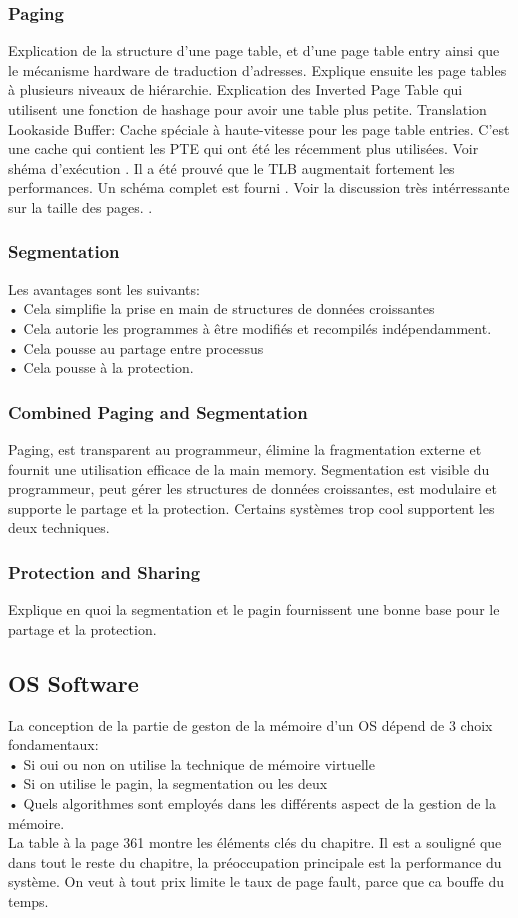 \subsubsection{Paging}
Explication de la structure d'une page table, et d'une page table entry ainsi que le mécanisme hardware de traduction d'adresses.
Explique ensuite les page tables à plusieurs niveaux de hiérarchie.
Explication des Inverted Page Table qui utilisent une fonction de hashage pour avoir une table plus petite.
Translation Lookaside Buffer: Cache spéciale à haute-vitesse pour les page table entries.
C'est une cache qui contient les PTE qui ont été les récemment plus utilisées.
Voir shéma d'exécution \cite[p.~351]{stallings}.
Il a été prouvé que le TLB augmentait fortement les performances.
Un schéma complet est fourni \cite[p.~352-353]{stallings}.
Voir la discussion très intérressante sur la taille des pages.
\cite[p.~354-355]{stallings}.
\subsubsection{Segmentation}
Les avantages sont les suivants:\\
• Cela simplifie la prise en main de structures de données croissantes\\
• Cela autorie les programmes à être modifiés et recompilés indépendamment.\\
• Cela pousse au partage entre processus\\
• Cela pousse à la protection.
\subsubsection{Combined Paging and Segmentation}
Paging, est transparent au programmeur, élimine la fragmentation externe et fournit une utilisation efficace de la main memory.
Segmentation est visible du programmeur, peut gérer les structures de données croissantes, est modulaire et supporte le partage et la protection.
Certains systèmes trop cool supportent les deux techniques.
\subsubsection{Protection and Sharing}
Explique en quoi la segmentation et le pagin fournissent une bonne base pour le partage et la protection.
\subsection{OS Software}
La conception de la partie de geston de la mémoire d'un OS dépend de 3 choix fondamentaux:\\
• Si oui ou non on utilise la technique de mémoire virtuelle\\
• Si on utilise le pagin, la segmentation ou les deux\\
• Quels algorithmes sont employés dans les différents aspect de la gestion de la mémoire.\\
La table à la page 361 montre les éléments clés du chapitre.
Il est a souligné que dans tout le reste du chapitre, la préoccupation principale est la performance du système.
On veut à tout prix limite le taux de page fault, parce que ca bouffe du temps.
